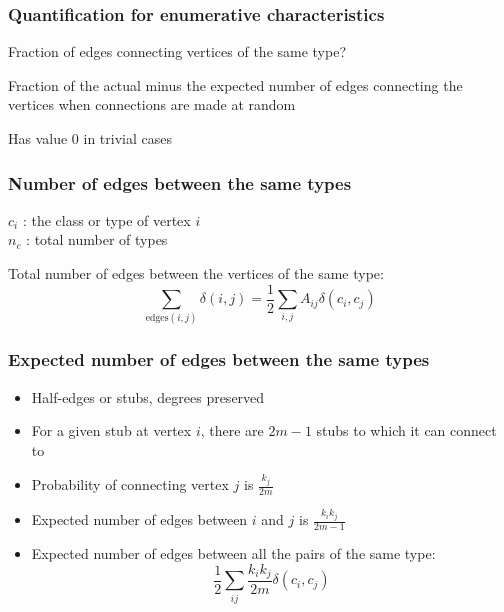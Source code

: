 \documentclass{beamer}
\begin{document}
\begin{frame}
    \frametitle{Quantification for enumerative characteristics}
        
    \begin{itemize}
    \setlength\itemsep{2em}
        \item{Fraction of edges connecting vertices of the same type?}
        
        \pause
        \item{Fraction of the actual minus the expected number of edges connecting the vertices when connections are made at random\\

        \pause
        \item{Has value $0$ in trivial cases}
}
    \end{itemize}
\end{frame}
\begin{frame}
    \frametitle{Number of edges between the same types}
        \begin{center}
        $c_i$ : the class or type of vertex $i$\\
        \vspace{2em}
        $n_c$ : total number of types
        \vspace{2em}

        Total number of edges between the vertices of the same type:
        $$\sum\limits_{\text{edges}(i,j)}\delta(i,j)=\frac{1}{2}\sum\limits_{i,j}A_{ij}\delta(c_i,c_j)$$ 
        \end{center}
\end{frame}
\begin{frame}
    \frametitle{Expected number of edges between the same types}
    \begin{itemize}
    \setlength\itemsep{1em}
        \item{Half-edges or stubs, degrees preserved}
        \item{For a given stub at vertex $i$, there are $2m-1$ stubs to which it can connect to}
        \item{Probability of connecting vertex $j$ is $\frac{k_j}{2m}$}
        \item{Expected number of edges between $i$ and $j$ is $\frac{k_ik_j}{2m-1}$}
        \item{Expected number of edges between all the pairs of the same type:
            $$\frac{1}{2}\sum\limits_{ij}\frac{k_ik_j}{2m}\delta(c_i,c_j)$$
}
    \end{itemize}
\end{frame}
\end{document}
